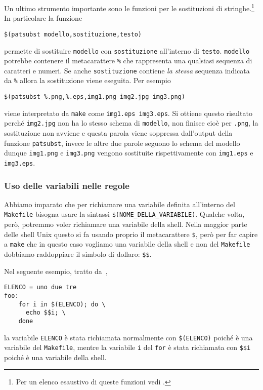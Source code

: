 Un ultimo strumento importante sono le funzioni per le sostituzioni di
stringhe.\footnote{Per un elenco esaustivo di queste funzioni vedi
  \textcite[80]{gnu:make}.}  In particolare la funzione
\begin{lstlisting}
$(patsubst modello,sostituzione,testo)
\end{lstlisting} %
permette di sostituire \texttt{modello} con \texttt{sostituzione} all'interno di
\texttt{testo}.  \texttt{modello} potrebbe contenere il metacarattere
\texttt{\%} che rappresenta una qualsiasi sequenza di caratteri e numeri.  Se
anche \texttt{sostituzione} contiene \emph{la stessa} sequenza indicata da
\texttt{\%} allora la sostituzione viene eseguita.  Per esempio
\begin{lstlisting}
$(patsubst %.png,%.eps,img1.png img2.jpg img3.png)
\end{lstlisting} %
viene interpretato da \texttt{make} come \texttt{img1.eps img3.eps}.  Si ottiene
questo risultato perché \texttt{img2.jpg} non ha lo stesso schema di
\texttt{modello}, non finisce cioè per \texttt{.png}, la sostituzione non
avviene e questa parola viene soppressa dall'output della funzione
\texttt{patsubst}, invece le altre due parole seguono lo schema del modello
dunque \texttt{img1.png} e \texttt{img3.png} vengono sostituite rispettivamente
con \texttt{img1.eps} e \texttt{img3.eps}.

\subsubsection{Uso delle variabili nelle regole}
\label{sec:uso-variabili}

Abbiamo imparato che per richiamare una variabile definita all'interno del
\texttt{Makefile} bisogna usare la sintassi \texttt{\$(NOME\_DELLA\_VARIABILE)}.
Qualche volta, però, potremmo voler richiamare una variabile della shell.  Nella
maggior parte delle shell Unix questo si fa usando proprio il metacarattere
\texttt{\$}, però per far capire a \texttt{make} che in questo caso vogliamo una
variabile della shell e non del \texttt{Makefile} dobbiamo raddoppiare il
simbolo di dollaro: \texttt{\$\$}.

Nel seguente esempio, tratto da~\textcite[43]{gnu:make},
\begin{lstlisting}
ELENCO = uno due tre
foo:
	for i in $(ELENCO); do \
	  echo $$i; \
	done
\end{lstlisting}
la variabile \texttt{ELENCO} è stata richiamata normalmente con
\texttt{\$(ELENCO)} poiché è una variabile del \texttt{Makefile}, mentre la
variabile \texttt{i} del \texttt{for} è stata richiamata con \texttt{\$\$i}
poiché è una variabile della shell.

